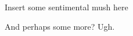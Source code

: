 \cleardoublepage
\thispagestyle{empty}
{}

\vspace*{3cm}

\begin{center}
    Insert some sentimental mush here  
\end{center}

\medskip

\begin{center}
    And perhaps some more? Ugh.
\end{center}